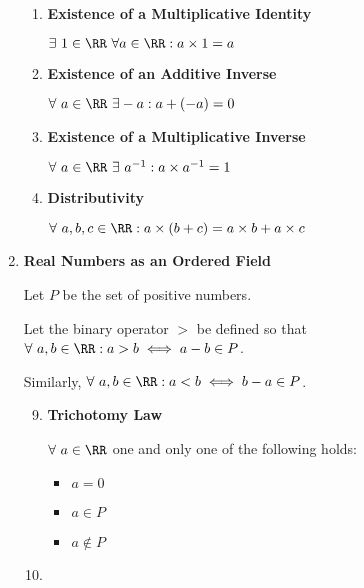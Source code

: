 \documentclass[11pt]{scrartcl}
\begin{document}
\begin{enumerate}
\begin{enumerate}
\item \textbf{Existence of a Multiplicative Identity}

\(\exists \ 1\in\RR\ \forall a \in \RR: a\times 1=a\)

\item \textbf{Existence of an Additive Inverse}

\(\forall \ a\in\RR\ \exists -a: a+(-a)=0\)

\item \textbf{Existence of a Multiplicative Inverse}

\(\forall \ a\in\RR\ \exists\ a^{-1}: a\times a^{-1}=1\)

\item \textbf{Distributivity}

\(\forall \ a,b,c \in \RR: a\times(b+c)=a\times b+a\times c\)
\end{enumerate}
\item \textbf{Real Numbers as an Ordered Field}
\label{sec:orgd6ca6e2}

Let \(P\) be the set of positive numbers.

Let the binary operator \(>\) be defined so that \(\forall \ a,b \in \RR: a > b \iff a-b\in P\).

Similarly,  \(\forall \ a,b \in \RR: a < b \iff b-a\in P\).

\begin{enumerate}
\setcounter{enumi}{8}
\item \textbf{Trichotomy Law}

\(\forall \ a \in \RR\) one and only one of the following holds:

\begin{itemize}
\item \(a=0\)

\item \(a \in P\)

\item \(a \not\in P\)
\end{itemize}

\item 
\end{enumerate}
\end{enumerate}
\end{document}
